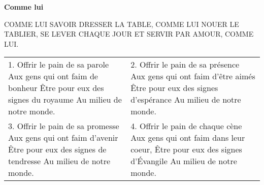 \textbf{Comme lui}

COMME LUI SAVOIR DRESSER LA TABLE,
COMME LUI NOUER LE TABLIER,
SE LEVER CHAQUE JOUR
ET SERVIR PAR AMOUR, COMME LUI.

\begin{tabular}{p{} p{}}
1.
Offrir le pain de sa parole
Aux gens qui ont faim de bonheur
Être pour eux des signes du royaume
Au milieu de notre monde.
&
2.
Offrir le pain de sa présence
Aux gens qui ont faim d’être aimés
Être pour eux des signes d’espérance
Au milieu de notre monde.
\\
3.
Offrir le pain de sa promesse
Aux gens qui ont faim d’avenir
Être pour eux des signes de tendresse
Au milieu de notre monde.
&
4.
Offrir le pain de chaque cène
Aux gens qui ont faim dans leur coeur,
Être pour eux des signes d’Évangile
Au milieu de notre monde.
\end{tabular}

